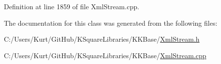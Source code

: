Definition at line 1859 of file Xml\+Stream.\+cpp.



The documentation for this class was generated from the following files\+:\begin{DoxyCompactItemize}
\item 
C\+:/\+Users/\+Kurt/\+Git\+Hub/\+K\+Square\+Libraries/\+K\+K\+Base/\hyperlink{_xml_stream_8h}{Xml\+Stream.\+h}\item 
C\+:/\+Users/\+Kurt/\+Git\+Hub/\+K\+Square\+Libraries/\+K\+K\+Base/\hyperlink{_xml_stream_8cpp}{Xml\+Stream.\+cpp}\end{DoxyCompactItemize}

